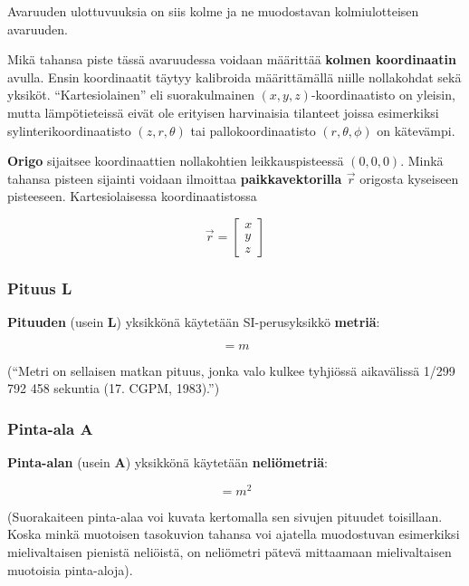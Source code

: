 \documentclass[12pt,a4paper,finnish]{book}
\begin{document}
Avaruuden ulottuvuuksia on siis kolme ja ne muodostavan kolmiulotteisen avaruuden. 

Mikä tahansa piste tässä avaruudessa voidaan määrittää \textbf{kolmen koordinaatin} avulla. 
Ensin koordinaatit täytyy kalibroida määrittämällä niille nollakohdat sekä yksiköt. ``Kartesiolainen'' eli 
suorakulmainen $(x, y, z)$-koordinaatisto on yleisin, mutta lämpötieteissä eivät ole erityisen harvinaisia tilanteet 
joissa esimerkiksi sylinterikoordinaatisto $(z, r, \theta)$ tai pallokoordinaatisto $(r, \theta, \phi)$ on kätevämpi.

\textbf{Origo} sijaitsee koordinaattien nollakohtien leikkauspisteessä $(0, 0, 0)$. Minkä tahansa pisteen sijainti 
voidaan ilmoittaa \textbf{paikkavektorilla $\vec{r}$} origosta kyseiseen pisteeseen. Kartesiolaisessa koordinaatistossa

\begin{equation}
 \vec{r} = \begin{bmatrix}
            x\\ y\\ z
           \end{bmatrix}
\end{equation}

\subsubsection{Pituus L}

\textbf{Pituuden} (usein \textbf{L}) yksikkönä käytetään SI-perusyksikkö \textbf{metriä}:

\begin{equation}
 [L] = m
\end{equation}

(``Metri on sellaisen matkan pituus, jonka valo kulkee tyhjiössä aikavälissä 1/299 792 458 sekuntia 
(17. CGPM, 1983).'')

\subsubsection{Pinta-ala A}

\textbf{Pinta-alan} (usein \textbf{A}) yksikkönä käytetään \textbf{neliömetriä}:

\begin{equation}
 [A] = m^2
\end{equation}

(Suorakaiteen pinta-alaa voi kuvata kertomalla sen sivujen pituudet toisillaan. Koska minkä muotoisen tasokuvion 
tahansa voi ajatella muodostuvan esimerkiksi mielivaltaisen pienistä neliöistä, on neliömetri pätevä mittaamaan 
mielivaltaisen muotoisia pinta-aloja).
\end{document}

